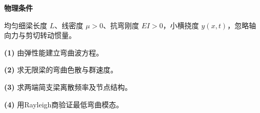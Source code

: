 \textbf{物理条件}\par 均匀细梁长度 \(L\)、线密度 \(\mu>0\)、抗弯刚度 \(EI>0\)，小横挠度 \(y(x,t)\)，忽略轴向力与剪切转动惯量。
\par\noindent\textbf{(1)} 由弹性能建立弯曲波方程。
\par\noindent\textbf{(2)} 求无限梁的弯曲色散与群速度。
\par\noindent\textbf{(3)} 求两端简支梁离散频率及节点结构。
\par\noindent\textbf{(4)} 用Rayleigh商验证最低弯曲模态。
